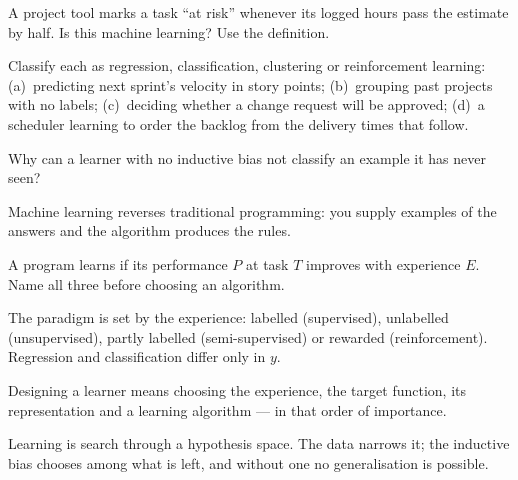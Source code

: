 \begin{checkpoint}
\begin{tightnum}
  \item A project tool marks a task ``at risk'' whenever its logged hours pass
        the estimate by half. Is this machine learning? Use the definition.
  \item Classify each as regression, classification, clustering or reinforcement
        learning: (a)~predicting next sprint's velocity in story points;
        (b)~grouping past projects with no labels; (c)~deciding whether a change
        request will be approved; (d)~a scheduler learning to order the backlog
        from the delivery times that follow.
  \item Why can a learner with no inductive bias not classify an example it has
        never seen?
\end{tightnum}
\end{checkpoint}

\begin{chaptersummary}
\begin{tight}
  \item Machine learning reverses traditional programming: you supply examples
        of the answers and the algorithm produces the rules.
  \item A program learns if its performance $P$ at task $T$ improves with
        experience $E$. Name all three before choosing an algorithm.
  \item The paradigm is set by the experience: labelled (supervised), unlabelled
        (unsupervised), partly labelled (semi-supervised) or rewarded
        (reinforcement). Regression and classification differ only in $y$.
  \item Designing a learner means choosing the experience, the target function,
        its representation and a learning algorithm --- in that order of
        importance.
  \item Learning is search through a hypothesis space. The data narrows it; the
        inductive bias chooses among what is left, and without one no
        generalisation is possible.
\end{tight}
\end{chaptersummary}

